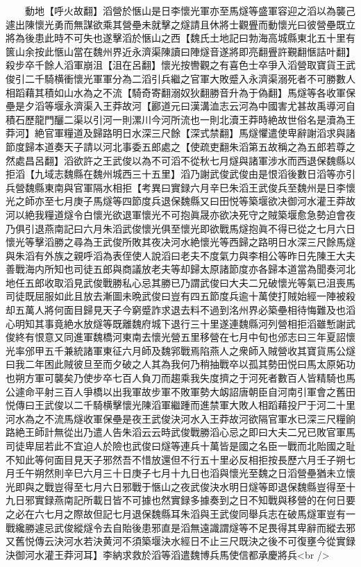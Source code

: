 　　動地【呼火故翻】滔營於愜山是日李懷光軍亦至馬燧等盛軍容迎之滔以為襲己遽出陳懷光勇而無謀欲乘其營壘未就擊之燧請且休將士觀舋而動懷光曰彼營壘既立將為後患此時不可失也遂擊滔於愜山之西【魏氏土地記曰勃海高城縣東北五十里有篋山余按此愜山當在魏州界近永濟渠陳讀曰陣燧音遂將即亮翻舋許覲翻愜詰叶翻】殺步卒千餘人滔軍崩沮【沮在呂翻】懷光按轡觀之有喜色士卒爭入滔營取寶貨王武俊引二千騎横衝懷光軍軍分為二滔引兵繼之官軍大敗蹙入永濟渠溺死者不可勝數人相蹈藉其積如山水為之不流【騎奇寄翻溺奴狄翻勝音升為于偽翻】馬燧等各收軍保壘是夕滔等堰永濟渠入王莽故河【酈道元曰漢溝洫志云河為中國害尤甚故禹導河自積石歷龍門釃二渠以引河一則漯川今河所流也一則北瀆王莽時絶故世俗名是瀆為王莽河】絶官軍糧道及歸路明日水深三尺餘【深式禁翻】馬燧懼遣使卑辭謝滔求與諸節度歸本道奏天子請以河北事委五郎處之【使疏吏翻朱滔第五故稱之為五郎若尊之然處昌呂翻】滔欲許之王武俊以為不可滔不從秋七月燧與諸軍涉水而西退保魏縣以拒滔【九域志魏縣在魏州城西三十五里】滔乃謝武俊武俊由是恨滔後數日滔等亦引兵營魏縣東南與官軍隔水相拒【考異曰實録六月辛巳朱滔王武俊兵至魏州是日李懷光之師亦至七月庚子馬燧等四節度兵退保魏縣又曰田悦等築堰欲决御河水灌王莽故河以絶我糧道燧令白懷光欲退軍懷光不可抱眞晟亦欲决死守之賊築堰愈急勢迫會夜乃俱引退燕南記曰六月朱滔武俊懷光俱至懷光即欲戰馬燧抱眞不得已從之七月六日懷光等擊滔勝之尋為王武俊所敗其夜决河水絶懷光等西歸之路明日水深三尺餘馬燧與朱滔有外族之親呼滔為表侄使人說滔曰老夫不度氣力與李相公等昨日先陳王大夫善戰海内所知也司徒五郎與商議放老夫等却歸太原諸節度亦各歸本道當為聞奏河北地任五郎收取滔見武俊戰勝私心忌其勝已乃謂武俊曰大夫二兄破懷光等氣已沮喪馬司徒既屈服如此且放去漸圖未晩武俊曰豈有四五節度兵逾十萬使打賊始經一陣被殺却五萬人將何面目歸見天子今窮蹙詐求退去料不過到洺州界必築壘相待悔難及也滔心明知其事竟絶水放燧等既離魏府城下退行三十里遂連魏縣河列營相拒滔雖慙謝武俊終有恨意又同進軍魏橋河東南去懷光營五里移營在七月中旬也邠志曰三年夏詔懷光率邠甲五千兼統諸軍東征六月師及魏郛戰焉陷燕人之衆師入賊營收其寶貨馬公燧曰我二年困此賊彼旦至而夕破之人其為我何乃稍抽戰卒以孤其勢田悦曰馬太原妬功也朔方軍可襲矣乃使步卒七百人負刀而趨乘我失度擠之于河死者數百人皆精騎也馬公遽命平射三百人爭橋以出我軍故步軍不敗軍勢大衂詔唐朝臣自河南引軍會之舊田悦傳曰王武俊以二千騎横擊懷光陳滔軍繼踵而進禁軍大敗人相蹈藉投尸于河二十里河水為之不流馬燧收軍保壘是夜王武俊決河水入王莽故河欲隔官軍水已深三尺糧餉路絶王師計無從出乃遣人告朱滔云云時武俊戰勝滔心忌之即曰大夫二兄已敗官軍馬司徒卑屈若此不宜迫人於險也武俊曰燧等連兵十萬皆是國之名臣一戰而北貽國之耻不知此等何面目見天子邪然吾不惜放還但不行五十里必反相拒按長歷六月壬子朔七月壬午朔然則辛巳六月三十日庚子七月十九日也滔與懷光至魏之日滔營壘猶未立懷光即與之戰豈得至七月六日邪戰于愜山之夜武俊決水明日燧等即退保魏縣豈得至十九日邪實録燕南記所載日皆不可據也然實録多據奏到之日不知戰與移營的在何日要之必在六七月之際故但記七月退保魏縣耳朱滔與王武俊同舉兵志在破馬燧軍豈有一戰纔勝遽忌武俊縱燧令去自貽後患邪直是滔無遠識謂燧等不足畏得其卑辭而縱去邪又舊悦傳云決河水若決黄河不須築堰決水經日不止三尺既決之後不可復壅今從實録決御河水灌王莽河耳】李納求救於滔等滔遣魏博兵馬使信都承慶將兵<br />
